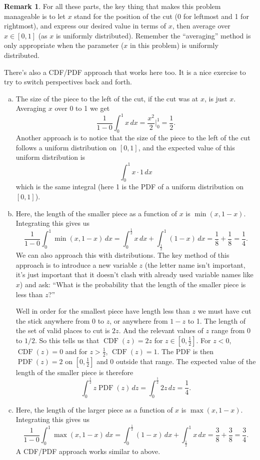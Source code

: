 \documentclass[11pt,oneside]{amsart}
\theoremstyle{definition}
\newtheorem{remark}{Remark}
\DeclareMathOperator{\PDF}{PDF}
\DeclareMathOperator{\CDF}{CDF}
\begin{document}
\begin{remark}
  For all these parts, the key thing that makes this problem manageable is to let $x$ stand for the position of the cut (0 for leftmost and 1 for rightmost), and express our desired value in terms of $x$, then average over $x\in[0,1]$ (as $x$ is uniformly distributed). Remember the ``averaging'' method is only appropriate when the parameter ($x$ in this problem) is uniformly distributed.

  There's also a CDF/PDF approach that works here too. It is a nice exercise to try to switch perspectives back and forth.
  \begin{enumerate}[(a)]
    \item The size of the piece to the left of the cut, if the cut was at $x$, is just $x$. Averaging $x$ over 0 to 1 we get
          \[\frac 1{1-0}\int_0^1 x\,dx=\frac{x^2}2\Big|_0^1=\frac 12.\]
          Another approach is to notice that the size of the piece to the left of the cut follows a uniform distribution on $[0,1]$, and the expected value of this uniform distribution is
          \[\int_0^1 x\cdot 1\,dx\]
          which is the same integral (here 1 is the PDF of a uniform distribution on $[0,1]$).

    \item Here, the length of the smaller piece as a function of $x$ is $\min(x,1-x)$. Integrating this gives us
          \[\frac 1{1-0}\int_0^1\min(x,1-x)\,dx=\int_0^{\frac12}x\,dx+\int_{\frac12}^1(1-x)\,dx=\frac 18+\frac18=\frac 14.\]
          We can also approach this with distributions. The key method of this approach is to introduce a new variable $z$ (the letter name isn't important, it's just important that it doesn't clash with already used variable names like $x$) and ask: ``What is the probability that the length of the smaller piece is less than $z$?''

          Well in order for the smallest piece have length less than $z$ we must have cut the stick anywhere from 0 to $z$, or anywhere from $1-z$ to 1. The length of the set of valid places to cut is $2z$. And the relevant values of $z$ range from 0 to $1/2$. So this tells us that $\CDF(z)=2z$ for $z\in[0,\frac 12]$. For $z<0$, $\CDF(z)=0$ and for $z>\frac12$, $\CDF(z)=1$. The PDF is then $\PDF(z)=2$ on $[0,\frac12]$ and 0 outside that range. The expected value of the length of the smaller piece is therefore
          \[\int_0^{\frac12}z\PDF(z)\,dz=\int_0^{\frac 12}2z\,dz=\frac 14.\]

    \item Here, the length of the larger piece as a function of $x$ is $\max(x,1-x)$. Integrating this gives us
          \[\frac 1{1-0}\int_0^1\max(x,1-x)\,dx=\int_0^{\frac12}(1-x)\,dx+\int_{\frac12}^1 x\,dx=\frac 38+\frac 38=\frac 34.\]
          A CDF/PDF approach works similar to above.
  \end{enumerate}
\end{remark}
\end{document}
